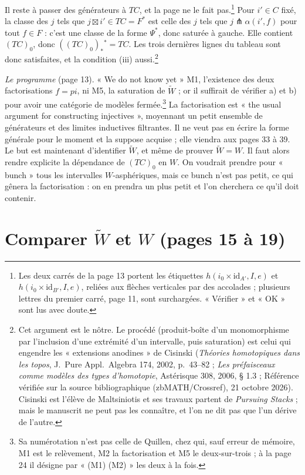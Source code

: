 \documentclass[11pt,a4paper]{article}
\begin{document}
Il reste à passer des générateurs à $TC$, et la page ne le fait
pas.\footnote{Les deux carrés de la page 13 portent les étiquettes
$h(i_0 \times \mathrm{id}_{A'}, I, e)$ et $h(i_0 \times \mathrm{id}_{B'}, I,
e)$, reliées aux flèches verticales par des accolades ; plusieurs lettres du
premier carré, page 11, sont surchargées. « Vérifier » et « OK » sont lus
avec doute.} Pour $i' \in C$ fixé, la classe des $j$ tels que
$j \boxtimes i' \in TC = F^*$ est celle des $j$ tels que
$j \pitchfork \alpha(i', f)$ pour tout $f \in F$ : c'est une classe de la
forme $\Psi^*$, donc saturée à gauche. Elle contient $(TC)_0$, donc
$((TC)_0)_*{}^* = TC$. Les trois dernières lignes du tableau sont donc
satisfaites, et la condition (iii) aussi.\footnote{Cet argument est le nôtre.
Le procédé (produit-boîte d'un monomorphisme par l'inclusion d'une extrémité
d'un intervalle, puis saturation) est celui qui engendre les « extensions
anodines » de Cisinski (\emph{Théories homotopiques dans les topos}, J.~Pure Appl.\ Algebra 174, 2002, p.~43--82 ; \emph{Les préfaisceaux comme modèles des types d'homotopie}, Astérisque 308, 2006, § 1.3 ; Référence vérifiée sur la source bibliographique (zbMATH/Crossref), 21 octobre 2026). Cisinski est l'élève de Maltsiniotis et ses travaux partent de
\emph{Pursuing Stacks} ; mais le manuscrit ne peut pas les connaître, et l'on
ne dit pas que l'un dérive de l'autre.}

\emph{Le programme} (page 13). « We do not know yet » M1, l'existence
des deux factorisations $f = pi$, ni M5, la saturation de $\widetilde W$ ; or
il suffirait de vérifier a) et b) pour avoir une catégorie de modèles
fermée.\footnote{Sa numérotation n'est pas celle de Quillen, chez qui, sauf
erreur de mémoire, M1 est le relèvement, M2 la factorisation et M5 le
deux-sur-trois ; à la page 24 il désigne par « (M1) (M2) » les deux à la
fois.} La factorisation est « the usual argument for constructing injectives », moyennant un petit ensemble de générateurs et des limites
inductives filtrantes. Il ne veut pas en écrire la forme générale pour le
moment et la suppose acquise ; elle viendra aux pages 33 à 39. Le but est
maintenant d'identifier $\widetilde W$, et même de prouver $\widetilde W = W$.
Il faut alors rendre explicite la dépendance de $(TC)_0$ en $W$. On voudrait
prendre pour « bunch » tous les intervalles $W$-asphériques, mais ce bunch
n'est pas petit, ce qui gênera la factorisation : on en prendra un plus petit
et l'on cherchera ce qu'il doit contenir.

\section*{Comparer $\widetilde W$ et $W$ (pages 15 à 19)}
\end{document}
